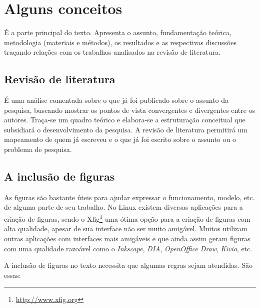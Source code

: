
\chapter{Alguns conceitos}
\label{c_cap2}

É a parte principal do texto. Apresenta o assunto, fundamentação teórica, metodologia (materiais e métodos), os resultados e as respectivas discussões traçando relações com os trabalhos analisados na revisão de literatura.

\section{Revisão de literatura}\label{s_c2_revisao}

É uma análise comentada sobre o que já foi publicado sobre o assunto da pesquisa, buscando mostrar os pontos de vista convergentes e divergentes entre os autores. Traça-se um quadro teórico e elabora-se a estruturação conceitual que subsidiará o desenvolvimento da pesquisa. A revisão de literatura permitirá um mapeamento de quem já escreveu e o que já foi escrito sobre o assunto ou o problema de pesquisa.







\section{A inclusão de figuras}
\label{s_c2_figuras}

As figuras são bastante úteis para ajudar expressar o funcionamento, modelo, etc. de alguma parte de seu trabalho. No Linux existem diversas aplicações para a criação de figuras, sendo o Xfig\footnote{\url{http://www.xfig.org}} uma ótima opção para a criação de figuras com alta qualidade, apesar de sua interface não ser muito amigável. Muitos utilizam outras aplicações com interfaces mais amigáveis e que ainda assim geram figuras com uma qualidade razoável como o \textit{Inkscape}, \textit{DIA}, \textit{OpenOffice Draw}, \textit{Kivio}, etc.

A inclusão de figuras no texto necessita que algumas regras sejam atendidas. São essas:

